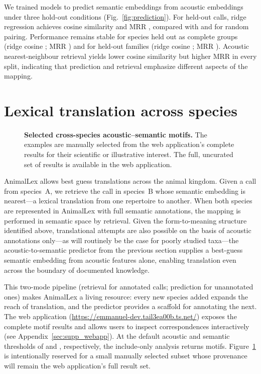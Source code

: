 \documentclass[external]{esp-paper}
\newcommand{\dbname}{AnimalLex\xspace}
\begin{document}
We trained models to predict semantic embeddings from acoustic embeddings under three hold-out conditions (Fig.~\ref{fig:prediction}). For held-out calls, ridge regression achieves cosine similarity \RidgeHeldOutCallsCosine and MRR \RidgeHeldOutCallsMRR, compared with \RandomHeldOutCallsCosine and \RandomHeldOutCallsMRR for random pairing. Performance remains stable for species held out as complete groups (ridge cosine \RidgeHeldOutSpeciesCosine; MRR \RidgeHeldOutSpeciesMRR) and for held-out families (ridge cosine \RidgeHeldOutFamiliesCosine; MRR \RidgeHeldOutFamiliesMRR). Acoustic nearest-neighbour retrieval yields lower cosine similarity but higher MRR in every split, indicating that prediction and retrieval emphasize different aspects of the mapping.

\section{Lexical translation across species}


\begin{figure}[!h]
	\centering
	\caption{%
		\textbf{Selected cross-species acoustic--semantic motifs.}
		The examples are manually selected from the web application's complete results for their scientific or illustrative interest. The full, uncurated set of results is available in the web application.
	}
	\label{fig:landmarks}
\end{figure}

AnimalLex allows best guess translations across the animal kingdom. Given a call from species~A, we retrieve the call in species~B whose semantic embedding is nearest---a lexical translation from one repertoire to another. When both species are represented in \dbname with full semantic annotations, the mapping is performed in semantic space by retrieval. Given the form-to-meaning structure identified above, translational attempts are also possible on the basis of acoustic annotations only---as will routinely be the case for poorly studied taxa---the acoustic-to-semantic predictor from the previous section supplies a best-guess semantic embedding from acoustic features alone, enabling translation even across the boundary of documented knowledge.

This two-mode pipeline (retrieval for annotated calls; prediction for unannotated ones) makes \dbname a living resource: every new species added expands the reach of translation, and the predictor provides a scaffold for annotating the next. The web application (\url{https://emmanuel-dev.tail3ea00b.ts.net/}) exposes the complete motif results and allows users to inspect correspondences interactively (see Appendix~\ref{sec:supp_webapp}). At the default acoustic and semantic thresholds of \motifacousticthreshold and \motifsemanticthreshold, respectively, the include-only analysis returns \nmotifs motifs. Figure~\ref{fig:landmarks} is intentionally reserved for a small manually selected subset whose provenance will remain the web application's full result set.
\end{document}
